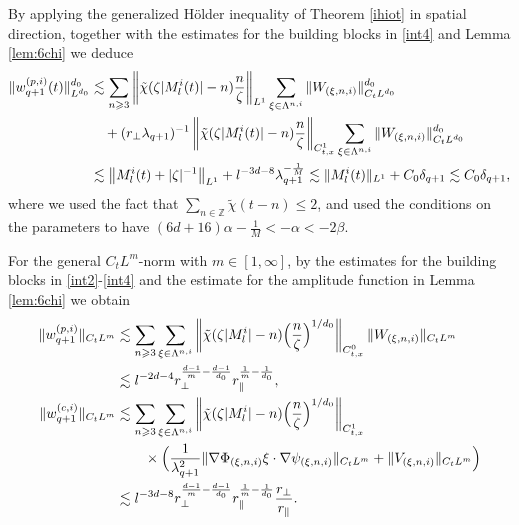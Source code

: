 \documentclass[10pt,a4paper]{amsart}
\numberwithin{equation}{section}
\def\({{\Big(}}
\def\){{\Big)}}
\newcommand{\norm}[1]{\left\|#1\right\|}
\def\geq{\geqslant}
\def\leq{\leqslant}
\def\({{\Big(}}
\def\){{\Big)}}
\def\geq{\geqslant}
\def\leq{\leqslant}
\begin{document}
By applying the generalized H\"older inequality of 
Theorem \ref{ihiot} in spatial direction, together with the estimates for the building blocks in \eqref{int4} and Lemma \ref{lem:6chi} we deduce 
\begin{align}
\|w_{q+1}^{(p,i)}(t)\|^{d_0}_{L^{d_0}}%
&\lesssim\sum_{n\geq3}\norm{\tilde{\chi}(\zeta|M^{i}_l(t)|-n)\frac{n}{\zeta}}_{L^1}\sum_{\xi\in\Lambda^{n,i}}\|W_{(\xi,n,i)}\|_{C_tL^{d_0}}^{d_0}\notag\\ 
&\quad+(r_\perp\lambda_{q+1})^{-1}\norm{\tilde{\chi}(\zeta|M^{i}_l(t)|-n)\frac{n}{\zeta}}_{C_{t,x}^1}\sum_{\xi\in\Lambda^{n,i}}\|W_{(\xi,n,i)}\|_{C_tL^{d_0}}^{d_0} \notag\\
&\lesssim\norm{ M^{i}_l(t)+|\zeta|^{-1}
}_{L^1}+l^{-3d-8}\lambda_{q+1}^{-\frac{1}{M}} \lesssim \|M^{i}_l(t)\|_{L^1}+C_0 \delta_{q+1} \lesssim C_0\delta_{q+1} 
,\notag
\end{align}
where we used   the fact that $\sum_{n\in\mathbb{Z}} \tilde{\chi}(t - n) \leq2$, and used the conditions on the parameters to have $(6d+16)\alpha-\frac{1}{M}<-\alpha<-2\beta$.  

For the general $C_tL^m$-norm with $m\in[1,\infty]$, by the estimates for the building blocks in \eqref{int2}-\eqref{int4} 
and the estimate for the amplitude function in  Lemma \ref{lem:6chi} we obtain
\begin{align}
\|w_{q+1}^{(p,i)}\|_{C_tL^m}&\lesssim\sum_{n\geq3}\sum_{\xi\in\Lambda^{n,i}}\norm{\tilde{\chi}(\zeta|M^{i}_l|-n)\(\frac{n}{\zeta}\)^{1/d_0}}_{C_{t,x}^0}\|W_{(\xi,n,i)}\|_{C_tL^m}\notag\\
&\lesssim l^{-2d-4}r_\perp^{\frac{d-1}{m}-\frac{d-1}{d_0}} r_\parallel^{\frac{1}{m}-\frac{1}{d_0}},\label{bd:6wq+1plp}\\
\|w_{q+1}^{(c,i)}\|_{C_tL^m}&\lesssim\sum_{n\geq3}\sum_{\xi\in\Lambda^{n,i}}\norm{\tilde{\chi}(\zeta|M^{i}_l|-n)\(\frac{n}{\zeta}\)^{1/d_0}}_{C^1_{t,x}}\notag\\ 
&\quad\quad \times\(\frac{1}{\lambda_{q+1}^2}\|\nabla\Phi_{(\xi,n,i)} \xi\cdot\nabla\psi_{(\xi,n,i)} \|_{C_tL^m}+\|V_{(\xi,n,i)}\|_{C_tL^m}\)\notag\\
&\lesssim l^{-3d-8}r_\perp^{\frac{d-1}{m}-\frac{d-1}{d_0}} r_\parallel^{\frac{1}{m}-\frac{1}{d_0}}\frac{r_\perp}{ r_\parallel}.\label{bd:6wq+1clp}
\end{align}
\end{document}
